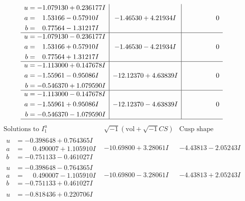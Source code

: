 \documentclass[1p]{elsarticle_modified}
\theoremstyle{definition}
\newcommand{\I}{\sqrt{-1}}
\begin{document}
$$\begin{array}{c|c|c}
\begin{aligned}
u &= -1.079130 + 0.236177 I \\
a &= \phantom{-}1.53166 - 0.57910 I \\
b &= \phantom{-}0.77564 - 1.31217 I\end{aligned}
 & -1.46530 + 4.21934 I & \phantom{-0.000000 } 0 \\ \hline\begin{aligned}
u &= -1.079130 - 0.236177 I \\
a &= \phantom{-}1.53166 + 0.57910 I \\
b &= \phantom{-}0.77564 + 1.31217 I\end{aligned}
 & -1.46530 - 4.21934 I & \phantom{-0.000000 } 0 \\ \hline\begin{aligned}
u &= -1.113000 + 0.147678 I \\
a &= -1.55961 - 0.95086 I \\
b &= -0.546370 + 1.079590 I\end{aligned}
 & -12.12370 + 4.63839 I & \phantom{-0.000000 } 0 \\ \hline\begin{aligned}
u &= -1.113000 - 0.147678 I \\
a &= -1.55961 + 0.95086 I \\
b &= -0.546370 - 1.079590 I\end{aligned}
 & -12.12370 - 4.63839 I & \phantom{-0.000000 } 0\\
 \hline 
 \end{array}$$\newpage$$\begin{array}{c|c|c}  
\text{Solutions to }I^u_{1}& \I (\text{vol} + \sqrt{-1}CS) & \text{Cusp shape}\\
 \hline 
\begin{aligned}
u &= -0.398648 + 0.764365 I \\
a &= \phantom{-}0.490007 + 1.105910 I \\
b &= -0.751133 - 0.461027 I\end{aligned}
 & -10.69800 + 3.28061 I & -4.43813 - 2.05243 I \\ \hline\begin{aligned}
u &= -0.398648 - 0.764365 I \\
a &= \phantom{-}0.490007 - 1.105910 I \\
b &= -0.751133 + 0.461027 I\end{aligned}
 & -10.69800 - 3.28061 I & -4.43813 + 2.05243 I \\ \hline\begin{aligned}
u &= -0.818436 + 0.220706 I \\

\end{aligned}
\end{array}$$
\end{document}
